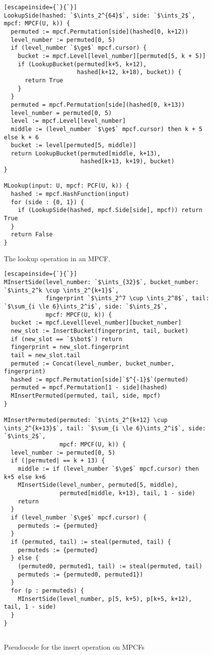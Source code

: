 \documentclass[letterpaper, 11pt]{article}
\newcommand{\ints}{\mathbb{Z}}
\begin{document}
\begin{figure}
\begin{lstlisting}[escapeinside={`}{`}]
LookupSide(hashed: `$\ints_2^{64}$`, side: `$\ints_2$`, mpcf: MPCF(U, k)) {
  permuted := mpcf.Permutation[side](hashed[0, k+12))
  level_number := permuted[0, 5)
  if (level_number `$\ge$` mpcf.cursor) {
    bucket := mpcf.Level[level_number][permuted[5, k + 5)]
    if (LookupBucket(permuted[k+5, k+12),
                     hashed[k+12, k+18), bucket)) {
      return True
    }
  }
  permuted = mpcf.Permutation[side](hashed[0, k+13))
  level_number = permuted[0, 5)
  level := mpcf.Level[level_number]
  middle := (level_number `$\ge$` mpcf.cursor) then k + 5 else k + 6
  bucket := level[permuted[5, middle)]
  return LookupBucket(permuted[middle, k+13),
                      hashed[k+13, k+19), bucket)
}

MLookup(input: U, mpcf: PCF(U, k)) {
  hashed := mpcf.HashFunction(input)
  for (side : {0, 1}) {
    if (LookupSide(hashed, mpcf.Side[side], mpcf)) return True
  }
  return False
}
\end{lstlisting}
\caption{The lookup operation in an MPCF.}
\end{figure}

\begin{figure}
\begin{lstlisting}[escapeinside={`}{`}]
MInsertSide(level_number: `$\ints_{32}$`, bucket_number: `$\ints_2^k \cup \ints_2^{k+1}$`,
            fingerprint `$\ints_2^7 \cup \ints_2^8$`, tail: `$\sum_{i \le 6}\ints_2^i$`, side: `$\ints_2$`,
            mpcf: MPCF(U, k)) {
  bucket := mpcf.Level[level_number][bucket_number]
  new_slot := InsertBucket(fingerprint, tail, bucket)
  if (new_slot == `$\bot$`) return
  fingerprint = new_slot.fingerprint
  tail = new_slot.tail
  permuted := Concat(level_number, bucket_number, fingerprint)
  hashed := mpcf.Permutation[side]`$^{-1}$`(permuted)
  permuted = mpcf.Permutation[1 - side](hashed)
  MInsertPermuted(permuted, tail, side, mpcf)
}

MInsertPermuted(permuted: `$\ints_2^{k+12} \cup \ints_2^{k+13}$`, tail: `$\sum_{i \le 6}\ints_2^i$`, side: `$\ints_2$`,
                mpcf: MPCF(U, k)) {
  level_number := permuted[0, 5)
  if (|permuted| == k + 13) {
    middle := if (level_number `$\ge$` mpcf.cursor) then k+5 else k+6
    MInsertSide(level_number, permuted[5, middle),
                permuted[middle, k+13), tail, 1 - side)
    return
  }
  if (level_number `$\ge$` mpcf.cursor) {
    permuteds := {permuted}
  }
  if (permuted, tail) := steal(permuted, tail) {
    permuteds := {permuted}
  } else {
    (permuted0, permuted1, tail) := steal(permuted, tail)
    permuteds := {permuted0, permuted1})
  }
  for (p : permuteds) {
    MInsertSide(level_number, p[5, k+5), p[k+5, k+12), tail, 1 - side)
  }
}


\end{lstlisting}
\caption{Pseudocode for the insert operation on MPCFs}
\end{figure}
\end{document}
